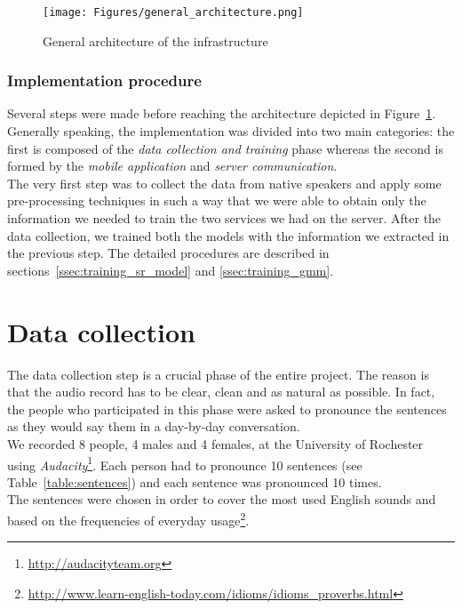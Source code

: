 \begin{figure}[!ht]
	\centering
	\texttt{[image: Figures/general\_architecture.png]}
	\caption{General architecture of the infrastructure}
	\label{fig:general_architecture}
\end{figure}

\subsubsection{Implementation procedure}
\label{ssec:procedure}

Several steps were made before reaching the architecture depicted in Figure~\ref{fig:general_architecture}. Generally speaking, the implementation was divided into two main categories: the first is composed of the \textit{data collection and training} phase whereas the second is formed by the \textit{mobile application} and \textit{server communication}. \\

\noindent The very first step was to collect the data from native speakers and apply some pre-processing techniques in such a way that we were able to obtain only the information we needed to train the two services we had on the server. After the data collection, we trained both the models with the information we extracted in the previous step. The detailed procedures are described in sections~\ref{ssec:training_sr_model} and \ref{ssec:training_gmm}.

\section{Data collection}
\label{sec:data_collection}

The data collection step is a crucial phase of the entire project. The reason is that the audio record has to be clear, clean and as natural as possible. In fact, the people who participated in this phase were asked to pronounce the sentences as they would say them in a day-by-day conversation. \\

\noindent We recorded 8 people, 4 males and 4 females, at the University of Rochester using \textit{Audacity}\footnote{\url{http://audacityteam.org}}. Each person had to pronounce 10 sentences (see Table~\ref{table:sentences}) and each sentence was pronounced 10 times. \\
\noindent The sentences were chosen in order to cover the most used English sounds and based on the frequencies of everyday usage\footnote{\url{http://www.learn-english-today.com/idioms/idioms_proverbs.html}}.

